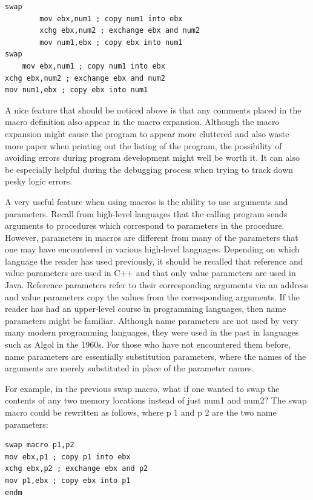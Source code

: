 \documentclass[10pt]{book}
\begin{document}
\begin{verbatim}
swap
        mov ebx,num1 ; copy num1 into ebx
        xchg ebx,num2 ; exchange ebx and num2
        mov num1,ebx ; copy ebx into num1
swap
    mov ebx,num1 ; copy num1 into ebx
xchg ebx,num2 ; exchange ebx and num2
mov num1,ebx ; copy ebx into num1
\end{verbatim}

A nice feature that should be noticed above is that any comments placed in the macro definition also appear in the macro expansion. Although the macro expansion might cause the program to appear more cluttered and also waste more paper when printing out the listing of the program, the possibility of avoiding errors during program development might well be worth it. It can also be especially helpful during the debugging process when trying to track down pesky logic errors.

A very useful feature when using macros is the ability to use arguments and parameters. Recall from high-level languages that the calling program sends arguments to procedures which correspond to parameters in the procedure. However, parameters in macros are different from many of the parameters that one may have encountered in various high-level languages. Depending on which language the reader has used previously, it should be recalled that reference and value parameters are used in C++ and that only value parameters are used in Java. Reference parameters refer to their corresponding arguments via an address and value parameters copy the values from the corresponding arguments. If the reader has had an upper-level course in programming languages, then name parameters might be familiar. Although name parameters are not used by very many modern programming languages, they were used in the past in languages such as Algol in the 1960s. For those who have not encountered them before, name parameters are essentially substitution parameters, where the names of the arguments are merely substituted in place of the parameter names.

For example, in the previous swap macro, what if one wanted to swap the contents of any two memory locations instead of just num1 and num2? The swap macro could be rewritten as follows, where p 1 and p 2 are the two name parameters:

\begin{verbatim}
swap macro p1,p2
mov ebx,p1 ; copy p1 into ebx
xchg ebx,p2 ; exchange ebx and p2
mov p1,ebx ; copy ebx into p1
endm
\end{verbatim}
\end{document}
